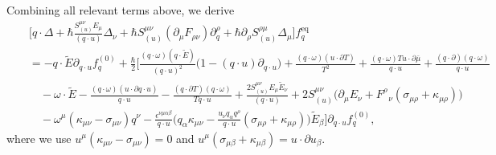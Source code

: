 \documentclass[aps,prd,showkeys,preprint,amsmath,amssymb,nofootinbib]{revtex4-1}
\begin{document}
Combining all relevant terms above, we derive 
\begin{eqnarray}\nonumber\label{2nd_order_cal}
&&\Bigg[
q\cdot\Delta+\hbar\frac{S_{(u)}^{\mu\nu}E_{\mu}}{(q\cdot u)}\Delta_{\nu}
+\hbar S_{(u)}^{\mu\nu}(\partial_{\mu}F_{\rho \nu})\partial^{\rho}_{q}+\hbar\partial_{\rho}S^{\rho\mu}_{(u)}\Delta_{\mu}\Bigg]f^\text{eq}_q
\\\nonumber
&&=-q\cdot\tilde{E}\partial_{q\cdot u} f^{(0)}_q
+\frac{\hbar}{2}
\Bigg[
\frac{(q\cdot\omega)(q\cdot\tilde{E})}{(q\cdot u)^2}\Big(1-(q\cdot u)\partial_{q\cdot u}\Big)
+\frac{(q\cdot\omega)(u\cdot\partial T)}{T^2}
+\frac{(q\cdot\omega)Tu\cdot\partial\bar{\mu}}{q\cdot u}+\frac{(q\cdot\partial)(q\cdot\omega)}{q\cdot u}
\\\nonumber
&&
\quad
-\omega\cdot\tilde{E}
-\frac{(q\cdot\omega)(u\cdot\partial q\cdot u)}{q\cdot u}
-\frac{(q\cdot\partial T)(q\cdot\omega)}{Tq\cdot u}
+\frac{2S^{\mu\nu}_{(u)}E_{\mu}\tilde{E}_{\nu}}{(q\cdot u)}
+2S^{\mu\nu}_{(u)}\Big(\partial_{\mu}E_{\nu}+F^{\rho}_{\mbox{ }\nu}(\sigma_{\mu\rho}+\kappa_{\mu\rho})\Big)
\\
&&\quad
-\omega^{\mu}(\kappa_{\mu\nu}-\sigma_{\mu\nu})q^{\nu} -\frac{\epsilon^{\nu\mu\alpha\beta}}{q\cdot u}\Bigg(q_{\alpha}\kappa_{\mu\nu}
-\frac{u_{\nu}q_{\alpha}q^{\rho}}{q\cdot u}(\sigma_{\mu\rho}+\kappa_{\mu\rho})\Bigg)\tilde{E}_{\beta}
\Bigg]
\partial_{q\cdot u}f^{(0)}_q
,
\end{eqnarray}
where we use
$u^{\mu}(\kappa_{\mu\nu}-\sigma_{\mu\nu})=0$ and $u^{\mu}(\sigma_{\mu\beta}+\kappa_{\mu\beta})=u\cdot\partial u_{\beta}$.

\end{document}
